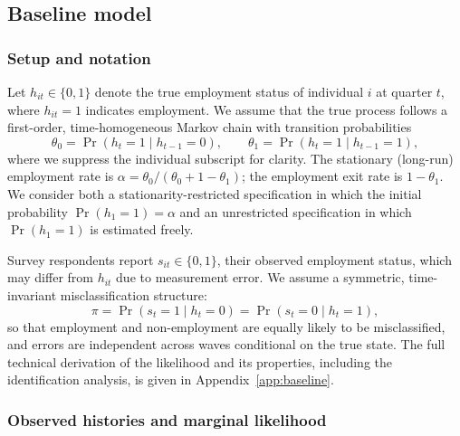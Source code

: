 
\subsection{Baseline model}\label{subsec:baseline}

\subsubsection*{Setup and notation}

Let $h_{it} \in \{0,1\}$ denote the true employment status of individual $i$ at
quarter $t$, where $h_{it} = 1$ indicates employment. We assume that the true
process follows a first-order, time-homogeneous Markov chain with transition
probabilities
\[
  \theta_0 = \Pr(h_{t}=1 \mid h_{t-1}=0), \qquad
  \theta_1 = \Pr(h_{t}=1 \mid h_{t-1}=1),
\]
where we suppress the individual subscript for clarity. The stationary
(long-run) employment rate is
$\alpha = \theta_0 / (\theta_0 + 1 - \theta_1)$; the employment exit rate is
$1-\theta_1$.
We consider both a stationarity-restricted specification in which the initial
probability $\Pr(h_1=1) = \alpha$ and an unrestricted specification in which
$\Pr(h_1=1)$ is estimated freely.

Survey respondents report $s_{it} \in \{0,1\}$, their observed employment
status, which may differ from $h_{it}$ due to measurement error. We assume
a symmetric, time-invariant misclassification structure:
\[
  \pi = \Pr(s_{t} = 1 \mid h_{t} = 0) = \Pr(s_{t} = 0 \mid h_{t} = 1),
\]
so that employment and non-employment are equally likely to be misclassified,
and errors are independent across waves conditional on the true state. The
full technical derivation of the likelihood and its properties, including
the identification analysis, is given in Appendix~\ref{app:baseline}.

\subsubsection*{Observed histories and marginal likelihood}

